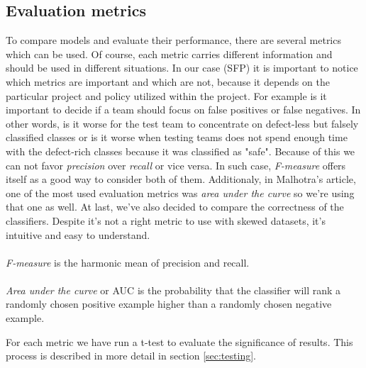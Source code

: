 \subsection{Evaluation metrics}
To compare models and evaluate their performance, there are several metrics which can be used. Of course, each metric carries different information and should be used in different situations. In our case (SFP) it is important to notice which metrics are important and which are not, because it depends on the particular project and policy utilized within the project.
For example is it important to decide if a team should focus on false positives or false negatives. In other words, is it worse for the test team to concentrate on defect-less but falsely classified classes or is it worse when testing teams does not spend enough time with the defect-rich classes because it was classified as "safe". Because of this we can not favor \textit{precision} over \textit{recall} or vice versa. In such case, \textit{F-measure} offers itself as a good way to consider both of them. Additionaly, in Malhotra's article\cite{malhotra2015systematic}, one of the most used evaluation metrics was \textit{area under the curve} so we're using that one as well. At last, we've also decided to compare the correctness of the classifiers. Despite it's not a right metric to use with skewed datasets, it's intuitive and easy to understand. \\\\
\textit{F-measure} is the harmonic mean of precision and recall.\cite{malhotra2015systematic}\\\\
\textit{Area under the curve} or AUC is the probability that the classifier will rank a randomly chosen positive example higher than a randomly chosen negative example.\cite{japkowicz2011evaluating}

For each metric we have run a t-test to evaluate the significance of results. This process is described in more detail in section \ref{sec:testing}. 